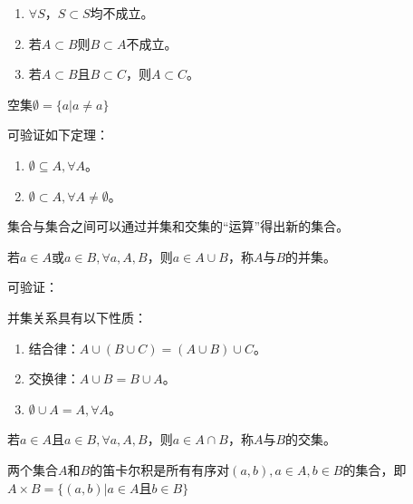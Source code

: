 \documentclass[main.tex]{subfiles}
\begin{document}
\begin{theorem}
\begin{enumerate}
    \item $\forall S$，$S\subset S$均不成立。
    \item 若$A\subset B$则$B\subset A$不成立。
    \item 若$A\subset B$且$B\subset C$，则$A\subset C$。
\end{enumerate}
\end{theorem}

\begin{definition}[空集]
空集$\emptyset = \{a|a\neq a\}$
\end{definition}

可验证如下定理：
\begin{theorem}
\begin{enumerate}
    \item $\emptyset\subseteq A,\forall A$。
    \item $\emptyset\subset A,\forall A\neq\emptyset$。
\end{enumerate}
\end{theorem}

集合与集合之间可以通过并集和交集的“运算”得出新的集合。

\begin{definition}[并集]
若$a\in A$或$a\in B,\forall a,A,B$，则$a\in A\cup B$，称$A$与$B$的并集。
\end{definition}

可验证：
\begin{theorem}
并集关系具有以下性质：
\begin{enumerate}
    \item 结合律：$A\cup\left(B\cup C\right)=\left(A\cup B\right)\cup C$。
    \item 交换律：$A\cup B=B\cup A$。
    \item $\emptyset\cup A=A,\forall A$。
\end{enumerate}
\end{theorem}

\begin{definition}[交集]
若$a\in A$且$a\in B,\forall a,A,B$，则$a\in A\cap B$，称$A$与$B$的交集。
\end{definition}

\begin{definition}[笛卡尔积]
两个集合$A$和$B$的笛卡尔积是所有有序对$\left(a,b\right),a\in A,b\in B$的集合，即 $A\times B=\{\left(a,b\right)|a\in A\text{且}b\in B\}$
\end{definition}
\end{document}
